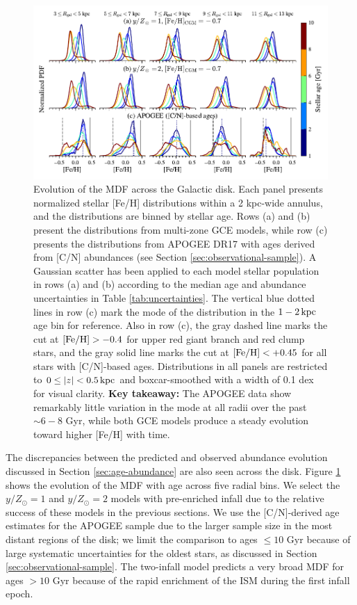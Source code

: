 \documentclass[twocolumn,twocolappendix,linenumbers]{aastex631}
\newcommand{\mathFeH}{{\rm [Fe/H]}}
\begin{document}
\begin{figure}
    \centering
    \includegraphics[width=0.9\linewidth]{figures/mdf_evolution.pdf}
    \caption{Evolution of the MDF across the Galactic disk. Each panel presents normalized stellar [Fe/H] distributions within a {2 kpc}-wide annulus, and the distributions are binned by stellar age. Rows (a) and (b) present the distributions from multi-zone GCE models, while row (c) presents the distributions from APOGEE DR17 with ages derived from [C/N] abundances (see Section \ref{sec:observational-sample}). A Gaussian scatter has been applied to each model stellar population in rows (a) and (b) according to the median age and abundance uncertainties in Table \ref{tab:uncertainties}. The vertical blue dotted lines in row (c) mark the mode of the distribution in the $1-2\,{\rm kpc}$ age bin for reference. Also in row (c), the gray dashed line marks the cut at $\mathFeH>-0.4$ for upper red giant branch and red clump stars, and the gray solid line marks the cut at $\mathFeH<+0.45$ for all stars with [C/N]-based ages. Distributions in all panels are restricted to $0\leq|z|<0.5\,{\rm kpc}$ and boxcar-smoothed with a width of {0.1 dex} for visual clarity. {\bf Key takeaway:} The APOGEE data show remarkably little variation in the mode at all radii over the past $\sim6-8$ Gyr, while both GCE models produce a steady evolution toward higher [Fe/H] with time.}
    \label{fig:mdf-evolution}
\end{figure}

The discrepancies between the predicted and observed abundance evolution discussed in Section \ref{sec:age-abundance} are also seen across the disk. Figure \ref{fig:mdf-evolution} shows the evolution of the MDF with age across five radial bins. We select the $y/Z_\odot=1$ and $y/Z_\odot=2$ models with pre-enriched infall due to the relative success of these models in the previous sections. We use the [C/N]-derived age estimates for the APOGEE sample due to the larger sample size in the most distant regions of the disk; we limit the comparison to ages $\leq10$ Gyr because of large systematic uncertainties for the oldest stars, as discussed in Section \ref{sec:observational-sample}. The two-infall model predicts a very broad MDF for ages $>10$ Gyr because of the rapid enrichment of the ISM during the first infall epoch.
\end{document}
